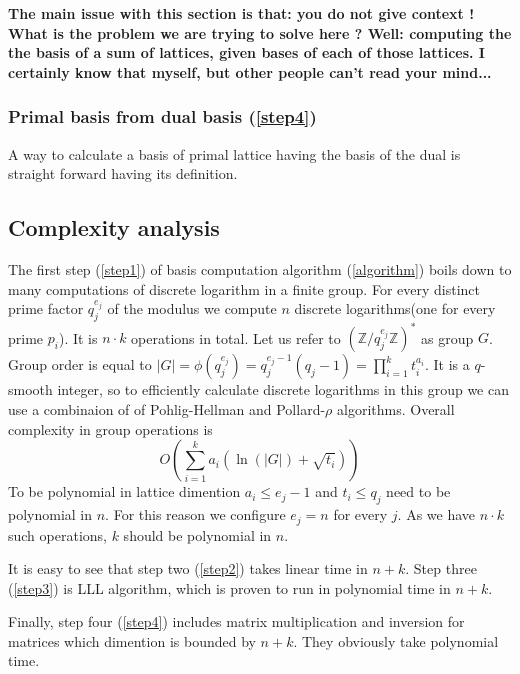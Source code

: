 \documentclass[12pt]{article}
\newcommand{\ZZ}{\mathbb{Z}}
\newtheorem{question}{Question}
\begin{document}
{\bf  The main issue with this section is that: you do not give context ! What is the problem we are trying to solve here ? Well: computing the the basis of a sum of lattices, given bases of each of those lattices. I certainly know that myself, but other people can't read your mind...}

\subsubsection{Primal basis from dual basis (\ref{step4})}

A way to calculate a basis of primal lattice having the basis of the dual is straight forward having its definition.


\subsection{Complexity analysis}
The first step (\ref{step1}) of basis computation algorithm (\ref{algorithm}) boils down to many computations of discrete logarithm in a finite group. For every distinct prime factor $q_{j}^{e_{j}}$ of the modulus we compute $n$ discrete logarithms(one for every prime $p_{i}$). It is $n \cdot k$ operations in total. Let us refer to $(\ZZ/q_{j}^{e_{j}}\ZZ)^*$ as group $G$. Group order is equal to $|G| = \phi(q_{j}^{e_{j}}) =  q_{j}^{e_{j}-1}(q_{j}-1) = \prod_{i=1}^{k} t_{i}^{a_{i}}$.
It is a $q$-smooth integer, so to efficiently calculate discrete logarithms in this group we can use a combinaion of of Pohlig-Hellman \cite{[PH78]} and Pollard-$\rho$ \cite{[Pol78]} algorithms. Overall complexity in group operations is
\[
    O(\sum_{i=1}^{k} a_{i}(\ln(|G|) + \sqrt{t_{i}}))
\]
To be polynomial in lattice dimention $a_{i} \leq e_{j}-1$ and $t_{i} \leq q_{j}$ need to be polynomial in $n$. For this reason we configure $e_{j} = n$ for every $j$. As we have $n \cdot k$ such operations, $k$ should be polynomial in $n$.


It is easy to see that step two (\ref{step2}) takes linear time in $n + k$. Step three (\ref{step3}) is LLL algorithm, which is proven to run in polynomial time in $n + k$.

Finally, step four (\ref{step4}) includes matrix multiplication and inversion for matrices which dimention is bounded by $n + k$. They obviously take polynomial time.
\end{document}
